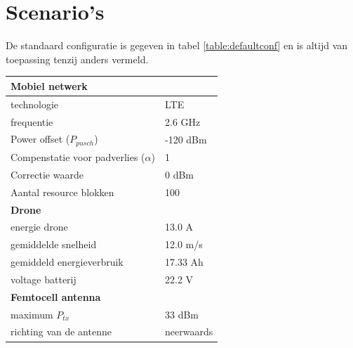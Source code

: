 \documentclass[twocolumn]{phdsymp_dutch}
\begin{document}

\section{Scenario's}

De standaard configuratie is gegeven in tabel \ref{table:defaultconf} en is altijd van toepassing tenzij anders vermeld.
\begin{table}[!htb]
\centering
\begin{tabular}[t]{ll}
        \toprule
        \multicolumn{2}{l}{\textbf{Mobiel netwerk}} \\
        \hline
        \hspace{3mm}  technologie        & LTE     \\
        \hspace{3mm}  frequentie         & 2.6 GHz \\
        \hspace{3mm}  Power offset ($P_{pusch}$)            & -120 dBm  \\
        \hspace{3mm}  Compenstatie voor padverlies ($\alpha$)   & 1  \\
        \hspace{3mm}  Correctie waarde                    & 0 dBm  \\
        \hspace{3mm}  Aantal resource blokken      & 100  \\
        \hline
        \multicolumn{2}{l}{\textbf{Drone}} \\
        \hline  
        \hspace{3mm}  energie drone        & 13.0 A   \\
        \hspace{3mm}  gemiddelde snelheid        & 12.0 m/s \\
        \hspace{3mm}  gemiddeld energieverbruik      & 17.33 Ah    \\
        \hspace{3mm}  voltage batterij       & 22.2 V \\
        \hline
        \multicolumn{2}{l}{\textbf{Femtocell antenna}} \\
        \hline  
        \hspace{3mm}  maximum $P_{tx}$          & 33 dBm   \\
        \hspace{3mm}  richting van de antenne   & neerwaards   \\ 

\end{tabular}
\end{table}
\end{document}
